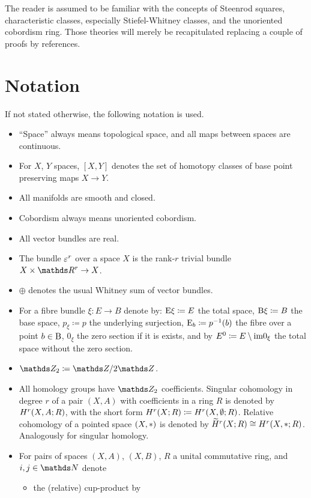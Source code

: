 The reader is assumed to be familiar with the concepts of Steenrod
squares, characteristic classes, especially Stiefel-Whitney classes,
and the unoriented cobordism ring. Those theories will merely be
recapitulated replacing a couple of proofs by references.

\section*{Notation}
If not stated otherwise, the following notation is used.
\begin{itemize}
\item \enquote{Space} always means topological space, and all maps
  between spaces are continuous.
\item For $X$, $Y$ spaces, $[X,Y]$ denotes the set of homotopy classes
  of base point preserving maps $X\to Y$.
\item All manifolds are smooth and closed.
\item Cobordism always means unoriented cobordism.
\item All vector bundles are real.
\item The bundle $\varepsilon^r$ over a space $X$ is the rank-$r$ trivial
  bundle $X\times\R^r\to X$.
\item $\oplus$ denotes the usual Whitney sum of vector bundles.
\item For a fibre bundle $\xi\colon E\to B$ denote by:
  $\mathrm{E}\xi\coloneqq E$ the total space,
  $\mathrm{B}\xi\coloneqq B$ the base space,
  $p_\xi\coloneqq p$ the underlying surjection,
  $\mathrm{E}_b\coloneqq p^{-1}(b)$ the fibre over a point $b\in \B$,
  $0_\xi$ the zero section if it is exists, and by
  ${E}^0\coloneqq E\setminus\mathrm{im}0_{\xi}$
  the total space without the zero section.
\item $\Zmod2 \coloneqq \Z/2\Z$.
\item All homology groups have $\Zmod2$ coefficients. Singular
  cohomology in degree $r$ of a pair $(X,A)$ with 
  coefficients in a ring $R$ is denoted by $H^r(X,A;R)$, with the
  short form $H^r(X;R)\coloneqq H^r(X,\emptyset;R)$. Relative cohomology
  of a pointed space $(X,*)$ is denoted by
  $\widetilde{H}^r(X;R)\cong H^r(X,*;R)$.
  Analogously for singular homology.
\item For pairs of spaces $(X,A)$, $(X,B)$, $R$ a unital commutative
  ring, and $i,j\in\Nat$ denote
  \begin{itemize}
  \item the (relative) cup-product by
    \begin{align*}

\end{align*}
\end{itemize}
\end{itemize}
